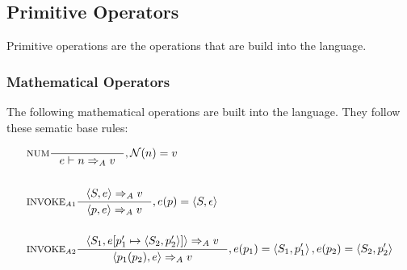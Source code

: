 \subsection{Primitive Operators}
\label{subsec:primitiveOps}
\newcommand{\Tand}{\text{\; AND \;}}
\newcommand{\Tnot}{\text{NOT \;}}
\newcommand{\Tnand}{\text{\; NAND \;}}
\newcommand{\Tor}{\text{\; OR \;}} 
\newcommand{\Tnor}{\text{\; NOR \;}}
\newcommand{\Txor}{\text{\; XOR \;}}

Primitive operations are the operations that are build into the language.

\subsubsection{Mathematical Operators}
\label{sec:mathOps}

The following mathematical operations are built into the language. They follow these sematic base rules:

\begin{align*}
&\inference[NUM]{}
                  {e \vdash n \Rightarrow_A v}
                  {, \mathcal{N}(n) = v}
\\\\
&\inference[$\text{INVOKE}_{A1}$]{\Braket{S,e} \Rightarrow_A v}
                  {\Braket{p,e} \Rightarrow_A v}
                  {,e(p) = \Braket{S,\epsilon}}
\\\\
&\inference[$\text{INVOKE}_{A2}$]{\Braket{S_1,e[p_1' \mapsto \Braket{S_2,p_2'}]} \Rightarrow_A v}
                  {\Braket{p_1(p_2),e} \Rightarrow_A v}
                  {,e(p_1) = \Braket{S_1,p_1'}, e(p_2) = \Braket{S_2,p_2'}}
\\\\
\end{align*}

